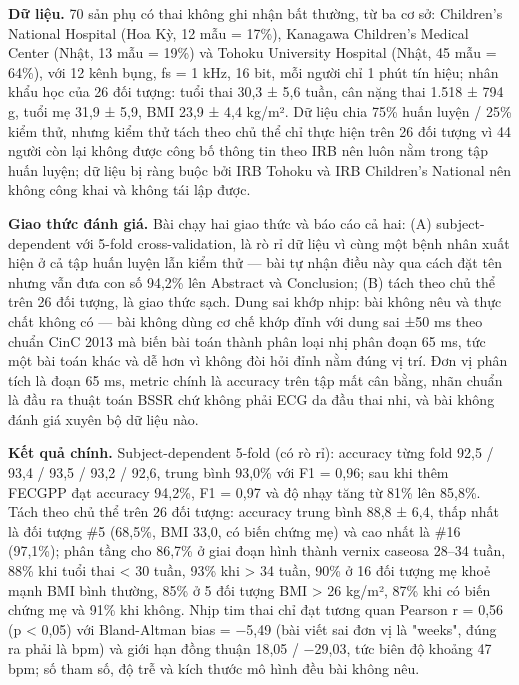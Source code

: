 \documentclass[12pt,a4paper]{article}
\begin{document}
\noindent \textbf{Dữ liệu.} 70 sản phụ có thai không ghi nhận bất thường, từ ba cơ sở: Children's National Hospital (Hoa Kỳ, 12 mẫu = 17\%), Kanagawa Children's Medical Center (Nhật, 13 mẫu = 19\%) và Tohoku University Hospital (Nhật, 45 mẫu = 64\%), với 12 kênh bụng, fs = 1 kHz, 16 bit, mỗi người chỉ 1 phút tín hiệu; nhân khẩu học của 26 đối tượng: tuổi thai 30,3 ± 5,6 tuần, cân nặng thai 1.518 ± 794 g, tuổi mẹ 31,9 ± 5,9, BMI 23,9 ± 4,4 kg/m². Dữ liệu chia 75\% huấn luyện / 25\% kiểm thử, nhưng kiểm thử tách theo chủ thể chỉ thực hiện trên 26 đối tượng vì 44 người còn lại không được công bố thông tin theo IRB nên luôn nằm trong tập huấn luyện; dữ liệu bị ràng buộc bởi IRB Tohoku và IRB Children's National nên không công khai và không tái lập được.\par\vspace{3pt}
\noindent \textbf{Giao thức đánh giá.} Bài chạy hai giao thức và báo cáo cả hai: (A) subject-dependent với 5-fold cross-validation, là rò rỉ dữ liệu vì cùng một bệnh nhân xuất hiện ở cả tập huấn luyện lẫn kiểm thử — bài tự nhận điều này qua cách đặt tên nhưng vẫn đưa con số 94,2\% lên Abstract và Conclusion; (B) tách theo chủ thể trên 26 đối tượng, là giao thức sạch. Dung sai khớp nhịp: bài không nêu và thực chất không có — bài không dùng cơ chế khớp đỉnh với dung sai ±50 ms theo chuẩn CinC 2013 mà biến bài toán thành phân loại nhị phân đoạn 65 ms, tức một bài toán khác và dễ hơn vì không đòi hỏi đỉnh nằm đúng vị trí. Đơn vị phân tích là đoạn 65 ms, metric chính là accuracy trên tập mất cân bằng, nhãn chuẩn là đầu ra thuật toán BSSR chứ không phải ECG da đầu thai nhi, và bài không đánh giá xuyên bộ dữ liệu nào.\par\vspace{3pt}
\noindent \textbf{Kết quả chính.} Subject-dependent 5-fold (có rò rỉ): accuracy từng fold 92,5 / 93,4 / 93,5 / 93,2 / 92,6, trung bình 93,0\% với F1 = 0,96; sau khi thêm FECGPP đạt accuracy 94,2\%, F1 = 0,97 và độ nhạy tăng từ 81\% lên 85,8\%. Tách theo chủ thể trên 26 đối tượng: accuracy trung bình 88,8 ± 6,4, thấp nhất là đối tượng \#5 (68,5\%, BMI 33,0, có biến chứng mẹ) và cao nhất là \#16 (97,1\%); phân tầng cho 86,7\% ở giai đoạn hình thành vernix caseosa 28–34 tuần, 88\% khi tuổi thai < 30 tuần, 93\% khi > 34 tuần, 90\% ở 16 đối tượng mẹ khoẻ mạnh BMI bình thường, 85\% ở 5 đối tượng BMI > 26 kg/m², 87\% khi có biến chứng mẹ và 91\% khi không. Nhịp tim thai chỉ đạt tương quan Pearson r = 0,56 (p < 0,05) với Bland-Altman bias = −5,49 (bài viết sai đơn vị là "weeks", đúng ra phải là bpm) và giới hạn đồng thuận 18,05 / −29,03, tức biên độ khoảng 47 bpm; số tham số, độ trễ và kích thước mô hình đều bài không nêu.\par\vspace{3pt}
\end{document}
